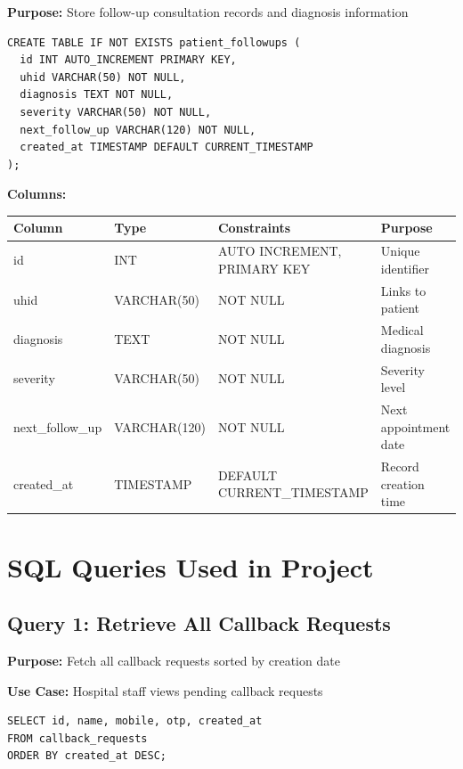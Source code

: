 \documentclass[12pt,a4paper]{article}
\begin{document}
\textbf{Purpose:} Store follow-up consultation records and diagnosis information

\begin{lstlisting}[caption={patient\_followups Table Schema}]
CREATE TABLE IF NOT EXISTS patient_followups (
  id INT AUTO_INCREMENT PRIMARY KEY,
  uhid VARCHAR(50) NOT NULL,
  diagnosis TEXT NOT NULL,
  severity VARCHAR(50) NOT NULL,
  next_follow_up VARCHAR(120) NOT NULL,
  created_at TIMESTAMP DEFAULT CURRENT_TIMESTAMP
);
\end{lstlisting}

\textbf{Columns:}
\begin{table}[h]
\centering
\begin{tabular}{|l|l|l|l|}
\hline
\textbf{Column} & \textbf{Type} & \textbf{Constraints} & \textbf{Purpose} \\
\hline
id & INT & AUTO INCREMENT, PRIMARY KEY & Unique identifier \\
uhid & VARCHAR(50) & NOT NULL & Links to patient \\
diagnosis & TEXT & NOT NULL & Medical diagnosis \\
severity & VARCHAR(50) & NOT NULL & Severity level \\
next\_follow\_up & VARCHAR(120) & NOT NULL & Next appointment date \\
created\_at & TIMESTAMP & DEFAULT CURRENT\_TIMESTAMP & Record creation time \\
\hline
\end{tabular}
\end{table}

\section{SQL Queries Used in Project}

\subsection{Query 1: Retrieve All Callback Requests}

\textbf{Purpose:} Fetch all callback requests sorted by creation date

\textbf{Use Case:} Hospital staff views pending callback requests

\begin{lstlisting}[caption={Get All Callback Requests}]
SELECT id, name, mobile, otp, created_at
FROM callback_requests
ORDER BY created_at DESC;
\end{lstlisting}
\end{document}
